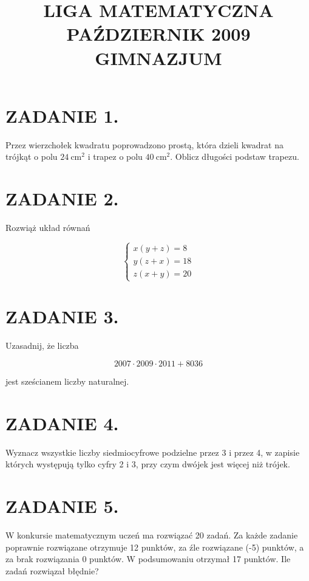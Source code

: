 \documentclass[10pt]{article}
\title{LIGA MATEMATYCZNA \\
 PAŹDZIERNIK 2009 \\
 GIMNAZJUM }
\author{}
\date{}
\begin{document}
\maketitle
\section*{ZADANIE 1.}
Przez wierzchołek kwadratu poprowadzono prostą, która dzieli kwadrat na trójkąt o polu \(24 \mathrm{~cm}^{2}\) i trapez o polu \(40 \mathrm{~cm}^{2}\). Oblicz długości podstaw trapezu.

\section*{ZADANIE 2.}
Rozwiąż układ równań

\[
\left\{\begin{array}{l}
x(y+z)=8 \\
y(z+x)=18 \\
z(x+y)=20
\end{array}\right.
\]

\section*{ZADANIE 3.}
Uzasadnij, że liczba

\[
2007 \cdot 2009 \cdot 2011+8036
\]

jest sześcianem liczby naturalnej.

\section*{ZADANIE 4.}
Wyznacz wszystkie liczby siedmiocyfrowe podzielne przez 3 i przez 4, w zapisie których występują tylko cyfry 2 i 3, przy czym dwójek jest więcej niż trójek.

\section*{ZADANIE 5.}
W konkursie matematycznym uczeń ma rozwiązać 20 zadań. Za każde zadanie poprawnie rozwiązane otrzymuje 12 punktów, za źle rozwiązane (-5) punktów, a za brak rozwiązania 0 punktów. W podsumowaniu otrzymał 17 punktów. Ile zadań rozwiązał błędnie?
\end{document}
